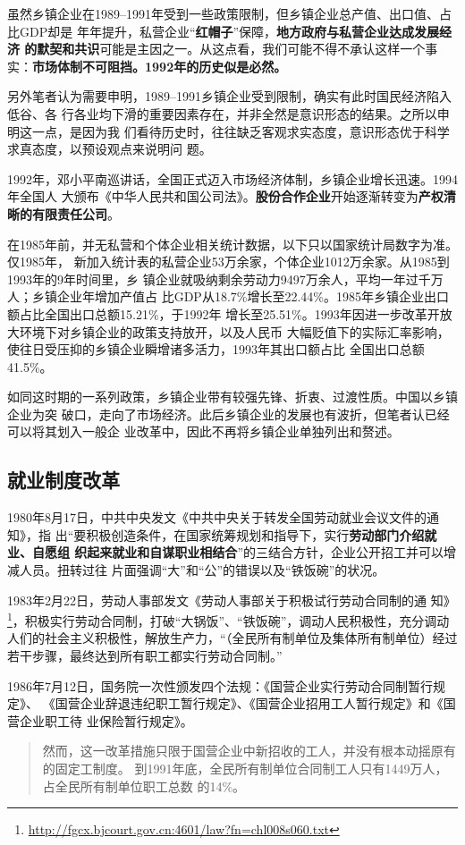 虽然乡镇企业在1989--1991年受到一些政策限制，但乡镇企业总产值、出口值、占比GDP却是
年年提升，私营企业“\textbf{红帽子}”保障，\textbf{地方政府与私营企业达成发展经济
  的默契和共识}可能是主因之一。从这点看，我们可能不得不承认这样一个事
实：\textbf{市场体制不可阻挡。1992年的历史似是必然。}

另外笔者认为需要申明，1989--1991乡镇企业受到限制，确实有此时国民经济陷入低谷、各
行各业均下滑的重要因素存在，并非全然是意识形态的结果。之所以申明这一点，是因为我
们看待历史时，往往缺乏客观求实态度，意识形态优于科学求真态度，以预设观点来说明问
题。

1992年，邓小平南巡讲话，全国正式迈入市场经济体制，乡镇企业增长迅速。1994年全国人
大颁布《中华人民共和国公司法》。\textbf{股份合作企业}开始逐渐转变为\textbf{产权清
  晰的有限责任公司}。

在1985年前，并无私营和个体企业相关统计数据，以下只以国家统计局数字为准。仅1985年，
新加入统计表的私营企业53万余家，个体企业1012万余家。从1985到1993年的9年时间里，乡
镇企业就吸纳剩余劳动力9497万余人，平均一年过千万人；乡镇企业年增加产值占
比GDP从18.7\%增长至22.44\%。1985年乡镇企业出口额占比全国出口总额15.21\%，于1992年
增长至25.51\%。1993年因进一步改革开放大环境下对乡镇企业的政策支持放开，以及人民币
大幅贬值下的实际汇率影响，使往日受压抑的乡镇企业瞬增诸多活力，1993年其出口额占比
全国出口总额41.5\%。

如同这时期的一系列政策，乡镇企业带有较强先锋、折衷、过渡性质。中国以乡镇企业为突
破口，走向了市场经济。此后乡镇企业的发展也有波折，但笔者认已经可以将其划入一般企
业改革中，因此不再将乡镇企业单独列出和赘述。

\subsection{就业制度改革}

1980年8月17日，中共中央发文《中共中央关于转发全国劳动就业会议文件的通知》，指
出“要积极创造条件，在国家统筹规划和指导下，实行\textbf{劳动部门介绍就业、自愿组
  织起来就业和自谋职业相结合}”的三结合方针，企业公开招工并可以增减人员。扭转过往
片面强调“大”和“公”的错误以及“铁饭碗”的状况。

1983年2月22日，劳动人事部发文《劳动人事部关于积极试行劳动合同制的通
知》\footnote{\url{http://fgcx.bjcourt.gov.cn:4601/law?fn=chl008s060.txt}}，积极实行劳动合同制，打破“大锅饭”、“铁饭碗”，调动人民积极性，充分调动人们的社会主义积极性，解放生产力，“（全民所有制单位及集体所有制单位）经过若干步骤，最终达到所有职工都实行劳动合同制。”

1986年7月12日，国务院一次性颁发四个法规：《国营企业实行劳动合同制暂行规定》、
《国营企业辞退违纪职工暂行规定》、《国营企业招用工人暂行规定》和《国营企业职工待
业保险暂行规定》。
\begin{quotation}
  然而，这一改革措施只限于国营企业中新招收的工人，并没有根本动摇原有的固定工制度。
  到1991年底，全民所有制单位合同制工人只有1449万人，占全民所有制单位职工总数
  的14\%。\cite{laodongzhiduyuanfang}
\end{quotation}

